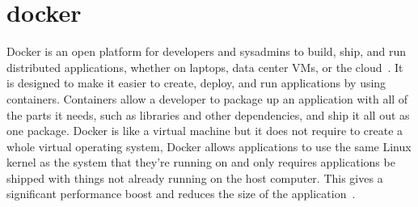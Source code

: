 \section{docker}
Docker is an open platform for developers and sysadmins to build, ship, 
and run distributed applications, whether on laptops, data center VMs, 
or the cloud~\cite{docker}. It is designed to make it easier to create, 
deploy, and run applications by using containers. Containers allow a 
developer to package up an application with all of the parts it needs, 
such as libraries and other dependencies, and ship it all out as one package. 
Docker is like a virtual machine but it does not require to create a whole 
virtual operating system, Docker allows applications to use the same Linux 
kernel as the system that they're running on and only requires applications 
be shipped with things not already running on the host computer. This gives 
a significant performance boost and reduces the size of the application~\cite{opensource}.
